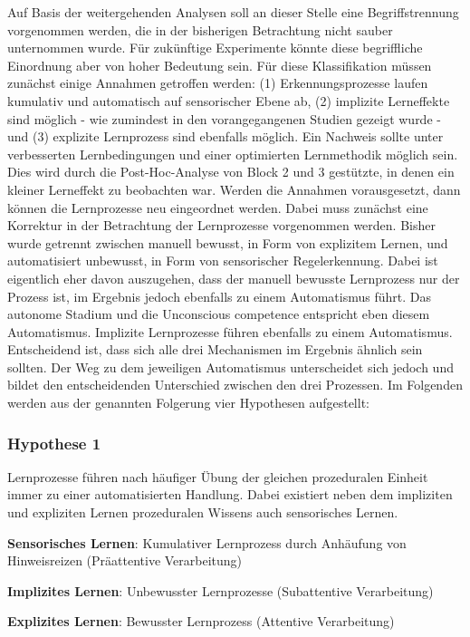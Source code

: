 \documentclass[doc,a4paper,12pt]{apa6}
\begin{document}
Auf Basis der weitergehenden Analysen soll an dieser Stelle eine Begriffstrennung vorgenommen werden, die in der bisherigen Betrachtung nicht sauber unternommen wurde. Für zukünftige Experimente könnte diese begriffliche Einordnung aber von hoher Bedeutung sein. Für diese Klassifikation müssen zunächst einige Annahmen getroffen werden: (1) Erkennungsprozesse laufen kumulativ und automatisch auf sensorischer Ebene ab, (2) implizite Lerneffekte sind möglich - wie zumindest in den vorangegangenen Studien gezeigt wurde - und (3) explizite Lernprozess sind ebenfalls möglich. Ein Nachweis sollte  unter verbesserten Lernbedingungen und einer optimierten Lernmethodik möglich sein. Dies wird durch die Post-Hoc-Analyse von Block 2 und 3 gestützte, in denen ein kleiner Lerneffekt zu beobachten war. Werden die Annahmen vorausgesetzt, dann können die Lernprozesse neu eingeordnet werden. Dabei muss zunächst eine Korrektur in der Betrachtung der Lernprozesse vorgenommen werden. Bisher wurde getrennt zwischen manuell bewusst, in Form von explizitem Lernen, und automatisiert unbewusst, in Form von sensorischer Regelerkennung. Dabei ist eigentlich eher davon auszugehen, dass der manuell bewusste Lernprozess nur der Prozess ist, im Ergebnis jedoch ebenfalls zu einem Automatismus führt. Das autonome Stadium und die Unconscious competence entspricht eben diesem Automatismus. Implizite Lernprozesse führen ebenfalls zu einem Automatismus. Entscheidend ist, dass sich alle drei Mechanismen im Ergebnis ähnlich sein sollten. Der Weg zu dem jeweiligen Automatismus unterscheidet sich jedoch und bildet den entscheidenden Unterschied zwischen den drei Prozessen. Im Folgenden werden aus der genannten Folgerung vier Hypothesen aufgestellt:

\subsubsection{Hypothese 1}

Lernprozesse führen nach häufiger Übung der gleichen prozeduralen Einheit immer zu einer automatisierten Handlung. Dabei existiert neben dem impliziten und expliziten Lernen prozeduralen Wissens auch sensorisches Lernen.

\begin{compactitem}
  \item \textbf{Sensorisches Lernen}: Kumulativer Lernprozess durch Anhäufung von Hinweisreizen (Präattentive Verarbeitung)
  \item \textbf{Implizites Lernen}: Unbewusster Lernprozesse (Subattentive Verarbeitung)
  \item \textbf{Explizites Lernen}: Bewusster Lernprozess (Attentive Verarbeitung)
\end{compactitem}
\end{document}
